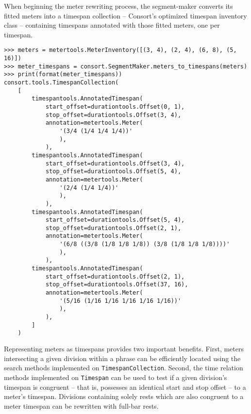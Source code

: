 When beginning the meter rewriting process, the segment-maker converts its
fitted meters into a timespan collection -- Consort's optimized timespan
inventory class -- containing timespans annotated with those fitted meters, one
per timespan.

\begin{comment}
<abjad>
meters = metertools.MeterInventory([(3, 4), (2, 4), (6, 8), (5, 16)])
meter_timespans = consort.SegmentMaker.meters_to_timespans(meters)
print(format(meter_timespans))
</abjad>
\end{comment}

\begin{abjadbookoutput}
\begin{singlespacing}
\vspace{-0.5\baselineskip}
\begin{lstlisting}
>>> meters = metertools.MeterInventory([(3, 4), (2, 4), (6, 8), (5, 16)])
>>> meter_timespans = consort.SegmentMaker.meters_to_timespans(meters)
>>> print(format(meter_timespans))
consort.tools.TimespanCollection(
    [
        timespantools.AnnotatedTimespan(
            start_offset=durationtools.Offset(0, 1),
            stop_offset=durationtools.Offset(3, 4),
            annotation=metertools.Meter(
                '(3/4 (1/4 1/4 1/4))'
                ),
            ),
        timespantools.AnnotatedTimespan(
            start_offset=durationtools.Offset(3, 4),
            stop_offset=durationtools.Offset(5, 4),
            annotation=metertools.Meter(
                '(2/4 (1/4 1/4))'
                ),
            ),
        timespantools.AnnotatedTimespan(
            start_offset=durationtools.Offset(5, 4),
            stop_offset=durationtools.Offset(2, 1),
            annotation=metertools.Meter(
                '(6/8 ((3/8 (1/8 1/8 1/8)) (3/8 (1/8 1/8 1/8))))'
                ),
            ),
        timespantools.AnnotatedTimespan(
            start_offset=durationtools.Offset(2, 1),
            stop_offset=durationtools.Offset(37, 16),
            annotation=metertools.Meter(
                '(5/16 (1/16 1/16 1/16 1/16 1/16))'
                ),
            ),
        ]
    )
\end{lstlisting}
\end{singlespacing}
\end{abjadbookoutput}

\noindent Representing meters as timespans provides two important benefits.
First, meters intersecting a given division within a phrase can be efficiently
located using the search methods implemented on \texttt{TimespanCollection}.
Second, the time relation methods implemented on \texttt{Timespan} can be used
to test if a given division's timespan is congruent -- that is, possesses an
identical start and stop offset -- to a meter's timespan. Divisions containing
solely rests which are also congruent to a meter timespan can be rewritten with
full-bar rests.

